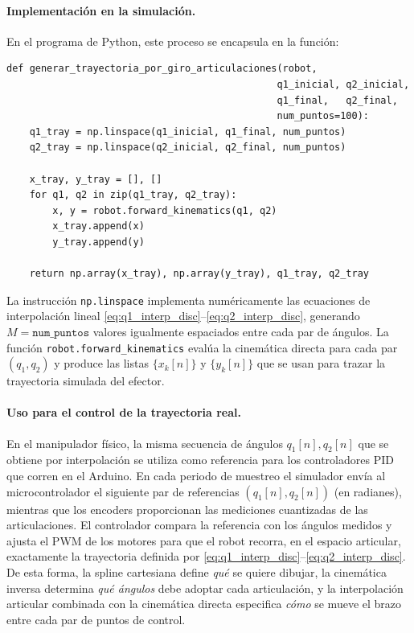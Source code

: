 \documentclass[11pt,a4paper]{article}
\begin{document}
\paragraph{Implementación en la simulación.}
En el programa de Python, este proceso se encapsula en la función:
\begin{verbatim}
def generar_trayectoria_por_giro_articulaciones(robot,
                                               q1_inicial, q2_inicial,
                                               q1_final,   q2_final,
                                               num_puntos=100):
    q1_tray = np.linspace(q1_inicial, q1_final, num_puntos)
    q2_tray = np.linspace(q2_inicial, q2_final, num_puntos)

    x_tray, y_tray = [], []
    for q1, q2 in zip(q1_tray, q2_tray):
        x, y = robot.forward_kinematics(q1, q2)
        x_tray.append(x)
        y_tray.append(y)

    return np.array(x_tray), np.array(y_tray), q1_tray, q2_tray
\end{verbatim}
La instrucción \texttt{np.linspace} implementa numéricamente las ecuaciones de interpolación lineal \eqref{eq:q1_interp_disc}–\eqref{eq:q2_interp_disc}, generando $M=\texttt{num\_puntos}$ valores igualmente espaciados entre cada par de ángulos.  
La función \texttt{robot.forward\_kinematics} evalúa la cinemática directa para cada par $(q_1,q_2)$ y produce las listas $\{x_{k}[n]\}$ y $\{y_{k}[n]\}$ que se usan para trazar la trayectoria simulada del efector.

\paragraph{Uso para el control de la trayectoria real.}
En el manipulador físico, la misma secuencia de ángulos $q_1[n],q_2[n]$ que se obtiene por interpolación se utiliza como referencia para los controladores PID que corren en el Arduino.  
En cada periodo de muestreo el simulador envía al microcontrolador el siguiente par de referencias $(q_1[n],q_2[n])$ (en radianes), mientras que los encoders proporcionan las mediciones cuantizadas de las articulaciones.  
El controlador compara la referencia con los ángulos medidos y ajusta el PWM de los motores para que el robot recorra, en el espacio articular, exactamente la trayectoria definida por \eqref{eq:q1_interp_disc}–\eqref{eq:q2_interp_disc}.  
De esta forma, la spline cartesiana define \emph{qué} se quiere dibujar, la cinemática inversa determina \emph{qué ángulos} debe adoptar cada articulación, y la interpolación articular combinada con la cinemática directa especifica \emph{cómo} se mueve el brazo entre cada par de puntos de control.
\end{document}
